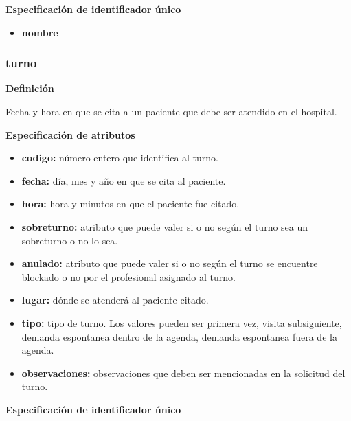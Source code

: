 \documentclass[a4paper,11pt]{article}
\begin{document}
\textbf{Especificación de identificador único}

\begin{itemize}

     \item \textbf{nombre}

\end{itemize}

\subsubsection{\textbf{turno}}

\textbf{Definición}

Fecha y hora en que se cita a un paciente que debe ser atendido en el hospital.

\textbf{Especificación de atributos}

\begin{itemize}

     \item \textbf{codigo:} número entero que identifica al turno.

     \item \textbf{fecha:} día, mes y año en que se cita al paciente.

     \item \textbf{hora:} hora y minutos en que el paciente fue citado.

     \item \textbf{sobreturno:} atributo que puede valer si o no según el turno sea un sobreturno 
     o no lo sea.

     \item \textbf{anulado:} atributo que puede valer si o no según el turno se encuentre blockado 
     o no por el profesional asignado al turno.

     \item \textbf{lugar:} dónde se atenderá al paciente citado.

     \item \textbf{tipo:} tipo de turno. Los valores pueden ser primera vez, visita subsiguiente, 
     demanda espontanea dentro de la agenda, demanda espontanea fuera de la agenda.

     \item \textbf{observaciones:} observaciones que deben ser mencionadas en la solicitud del turno.

\end{itemize}

\textbf{Especificación de identificador único}
\end{document}
